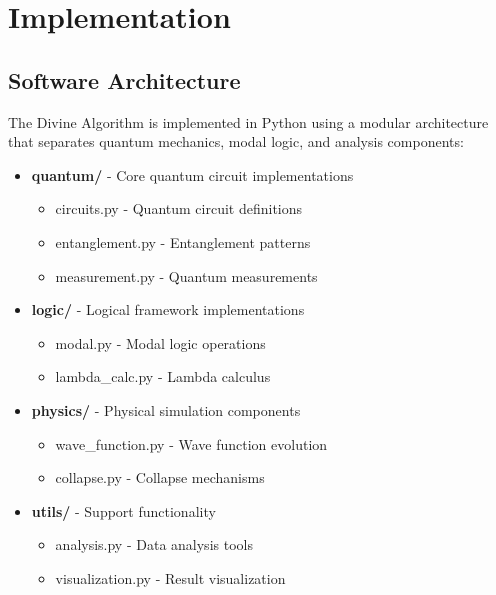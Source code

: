 \section{Implementation}\label{sec:implementation}

\subsection{Software Architecture}
The Divine Algorithm is implemented in Python using a modular architecture that separates quantum mechanics, modal logic, and analysis components:

\begin{itemize}
    \item \textbf{quantum/} - Core quantum circuit implementations
    \begin{itemize}
        \item circuits.py - Quantum circuit definitions
        \item entanglement.py - Entanglement patterns
        \item measurement.py - Quantum measurements
    \end{itemize}
    
    \item \textbf{logic/} - Logical framework implementations
    \begin{itemize}
        \item modal.py - Modal logic operations
        \item lambda\_calc.py - Lambda calculus
    \end{itemize}
    
    \item \textbf{physics/} - Physical simulation components
    \begin{itemize}
        \item wave\_function.py - Wave function evolution
        \item collapse.py - Collapse mechanisms
    \end{itemize}
    
    \item \textbf{utils/} - Support functionality
    \begin{itemize}
        \item analysis.py - Data analysis tools
        \item visualization.py - Result visualization
    \end{itemize}
\end{itemize}

